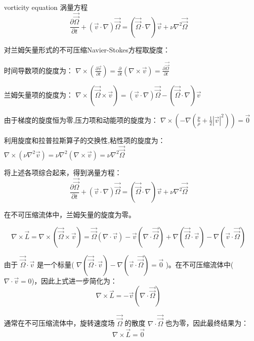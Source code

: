 \begin{defn}
    vorticity equation 涡量方程
    \[
        \frac{\partial \vec{\vec{\Omega}}}{\partial t} + (\vec{v} \cdot \nabla) \vec{\vec{\Omega}} 
        = (\vec{\vec{\Omega}} \cdot \nabla) \vec{v} + \nu \nabla^2 \vec{\vec{\Omega}}
    \]
\begin{tui}
    对兰姆矢量形式的不可压缩Navier-Stokes方程取旋度：

    时间导数项的旋度为：
    $
    \nabla \times \left( \frac{\partial \vec{v}}{\partial t} \right) = \frac{\partial}{\partial t} (\nabla \times \vec{v}) 
    = \frac{\partial \vec{\vec{\Omega}}}{\partial t}
    $

兰姆矢量项的旋度为：
$
\nabla \times (\vec{\vec{\Omega}} \times \vec{v}) 
= (\vec{v} \cdot \nabla) \vec{\vec{\Omega}} - (\vec{\vec{\Omega}} \cdot \nabla) \vec{v}
$

由于梯度的旋度恒为零,压力项和动能项的旋度为：
$
\nabla \times \left( -\nabla \left( \frac{p}{\rho} + \frac{1}{2} |\vec{v}|^2 \right) \right) = \vec{0}
$

利用旋度和拉普拉斯算子的交换性,粘性项的旋度为：
$
\nabla \times (\nu \nabla^2 \vec{v}) = \nu \nabla^2 (\nabla \times \vec{v}) = \nu \nabla^2 \vec{\vec{\Omega}}
$

将上述各项综合起来，得到涡量方程：
\[
    \frac{\partial \vec{\vec{\Omega}}}{\partial t} + (\vec{v} \cdot \nabla) \vec{\vec{\Omega}} 
    = (\vec{\vec{\Omega}} \cdot \nabla) \vec{v} + \nu \nabla^2 \vec{\vec{\Omega}}
\]
\end{tui}
\begin{zhu}
    在不可压缩流体中，兰姆矢量的旋度为零。
\begin{tui}
    $$
    \nabla \times \vec{L} = \nabla \times (\vec{\vec{\Omega}} \times \vec{v})
     = \vec{\vec{\Omega}} (\nabla \cdot \vec{v}) - \vec{v} (\nabla \cdot \vec{\vec{\Omega}}) + \nabla (\vec{\vec{\Omega}} \cdot \vec{v}) - \nabla (\vec{v} \cdot \vec{\vec{\Omega}})
    $$
    
    由于 $\vec{\vec{\Omega}} \cdot \vec{v}$ 是一个标量(
    $
    \nabla (\vec{\vec{\Omega}} \cdot \vec{v}) - \nabla (\vec{v} \cdot \vec{\vec{\Omega}}) = \vec{0}
    $ 
    )。在不可压缩流体中( $\nabla \cdot \vec{v} = 0$)，因此上式进一步简化为：
    $$
    \nabla \times \vec{L} = -\vec{v} (\nabla \cdot \vec{\vec{\Omega}})
    $$
    
    通常在不可压缩流体中，旋转速度场 $\vec{\vec{\Omega}}$ 的散度 $\nabla \cdot \vec{\vec{\Omega}}$ 也为零，因此最终结果为：
    $$
    \nabla \times \vec{L} = \vec{0}
    $$
\end{tui}
\end{zhu}
\end{defn}
